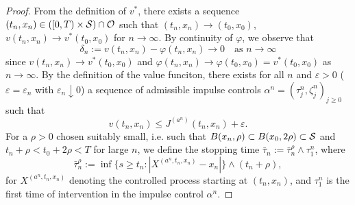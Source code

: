 \begin{proof}
    From the definition of $v^*$, there exists a sequence $(t_n,x_n) \in ([0,T) \times \mathcal{S}) \cap \mathcal{O} $ such that $(t_n,x_n) \rightarrow (t_0,x_0)$, $v(t_n,x_n) \rightarrow v^*(t_0,x_0)$ for $n \rightarrow \infty$. By continuity of $\varphi$, we observe that 
    \begin{equation*}
        \delta_n := v(t_n,x_n) - \varphi(t_n,x_n) \rightarrow 0 \quad \text{as } n \rightarrow \infty
    \end{equation*}
    since $v(t_n,x_n) \rightarrow v^*(t_0,x_0)$ and $\varphi(t_n,x_n) \rightarrow \varphi(t_0,x_0) = v^*(t_0,x_0)$ as $n \rightarrow \infty$. By the definition of the value funciton, there exists for all $n$ and $\varepsilon>0$ ($\varepsilon = \varepsilon_n$ with $\varepsilon_n \downarrow 0$) a sequence of admissible impulse controls $\alpha^n = (\tau_j^n, \zeta_j^n)_{j \geq 0}$ such that 
    \begin{equation}
        v(t_n,x_n) \leq J^{(a^n)}(t_n,x_n) + \varepsilon.
        \label{eqn: (25) in Seydel}
    \end{equation}
    For a $\rho>0$ chosen suitably small, i.e. such that $B(x_n,\rho) \subset B(x_0,2 \rho) \subset \mathcal{S}$ and $t_n + \rho < t_0 + 2 \rho < T$ for large $n$, we define the stopping time $\bar \tau_n := \bar \tau_n^\rho \wedge \tau_1^n$, where 
    \begin{equation*}
        \bar \tau_n^\rho  := \inf \big\{ s \geq t_n: |X^{(a^n, t_n,x_n)} - x_n| \big\} \wedge (t_n + \rho),
    \end{equation*}
    for $X^{(a^n, t_n,x_n)}$ denoting the controlled process starting at $(t_n,x_n)$, and $\tau_1^n$ is the first time of intervention in the impulse control $\alpha^n$. 
    

\end{proof}
